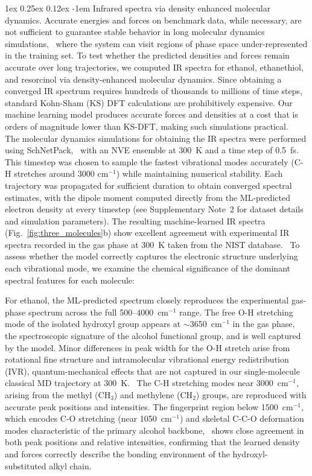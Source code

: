 \documentclass[12pt]{article}
\makeatletter
\renewcommand\paragraph{\@startsection{paragraph}{4}{\parindent}%
  {1ex \@plus 0.25ex \@minus 0.12ex}%
  {-1em}%
  {\normalfont\normalsize\itshape}}
\makeatother
\begin{document}
\paragraph{Infrared spectra via density enhanced molecular dynamics.}\label{sec:dipole_md}
Accurate energies and forces on benchmark data, while necessary, are not sufficient to guarantee stable behavior in long molecular dynamics simulations,~\cite{chmiela2018towards,fu2022forces} where the system can visit regions of phase space under-represented in the training set. 
To test whether the predicted densities and forces remain accurate over long trajectories, we computed IR spectra for ethanol, ethanethiol, and resorcinol via density-enhanced molecular dynamics.
Since obtaining a converged IR spectrum requires hundreds of thousands to millions of time steps, standard Kohn-Sham (KS) DFT calculations are prohibitively expensive. Our machine learning model produces accurate forces and densities at a cost that is orders of magnitude lower than KS-DFT, making such simulations practical.~\cite{ji2025universal}
The molecular dynamics simulations for obtaining the IR spectra were performed using SchNetPack,~\cite{schutt2018schnetpack} with an NVE ensemble at 300~K and a time step of 0.5~fs. This timestep was chosen to sample the fastest vibrational modes accurately (C-H stretches around 3000 cm$^{-1}$) while maintaining numerical stability. Each trajectory was propagated for sufficient duration to obtain converged spectral estimates, with the dipole moment computed directly from the ML-predicted electron density at every timestep (see Supplementary Note~2 for dataset details and simulation parameters).
The resulting machine-learned IR spectra (Fig.~\ref{fig:three_molecules}b) show excellent agreement with experimental IR spectra recorded in the gas phase at 300~K taken from the NIST database.~\cite{ralchenko2022nist} 
To assess whether the model correctly captures the electronic structure underlying each vibrational mode, we examine the chemical significance of the dominant spectral features for each molecule:

For ethanol, the ML-predicted spectrum closely reproduces the experimental gas-phase spectrum across the full 500--4000~cm$^{-1}$ range.
The free O-H stretching mode of the isolated hydroxyl group appears at $\sim$3650~cm$^{-1}$ in the gas phase, the spectroscopic signature of the alcohol functional group, and is well captured by the model.
Minor differences in peak width for the O-H stretch arise from rotational fine structure and intramolecular vibrational energy redistribution (IVR), quantum-mechanical effects that are not captured in our single-molecule classical MD trajectory at 300~K.~\cite{keshavamurthy2014scaling}
The C-H stretching modes near 3000~cm$^{-1}$, arising from the methyl (CH$_3$) and methylene (CH$_2$) groups, are reproduced with accurate peak positions and intensities.
The fingerprint region below 1500~cm$^{-1}$, which encodes C-O stretching (near 1050~cm$^{-1}$) and skeletal C-C-O deformation modes characteristic of the primary alcohol backbone,~\cite{nistwebbook} shows close agreement in both peak positions and relative intensities, confirming that the learned density and forces correctly describe the bonding environment of the hydroxyl-substituted alkyl chain.
\end{document}
